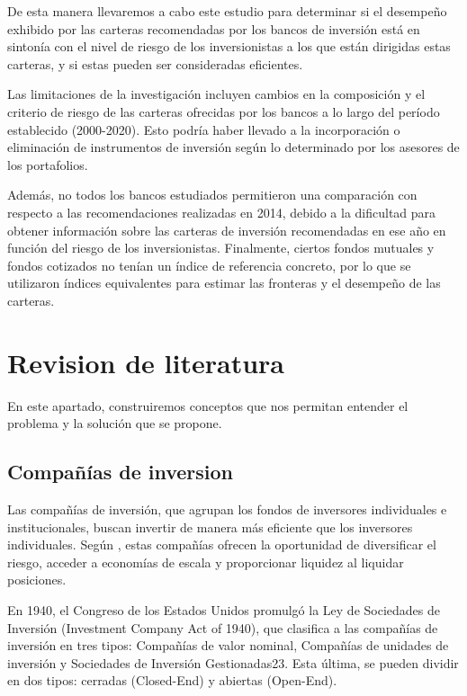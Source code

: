 \documentclass[a4paper,fleqn]{cas-sc}
\begin{document}
De esta manera llevaremos a cabo este estudio para determinar si el desempeño exhibido por las carteras recomendadas por los bancos de inversión está en sintonía con el nivel de riesgo de los inversionistas a los que están dirigidas estas carteras, y si estas pueden ser consideradas eficientes.

Las limitaciones de la investigación incluyen cambios en la composición y el criterio de riesgo de las carteras ofrecidas por los bancos a lo largo del período establecido {\color{red}(2000-2020)}. Esto podría haber llevado a la incorporación o eliminación de instrumentos de inversión según lo determinado por los asesores de los portafolios. 


Además, no todos los bancos estudiados permitieron una comparación con respecto a las recomendaciones realizadas en 2014, debido a la dificultad para obtener información sobre las carteras de inversión recomendadas en ese año en función del riesgo de los inversionistas. Finalmente, ciertos fondos mutuales y fondos cotizados no tenían un índice de referencia concreto, por lo que se utilizaron índices equivalentes para estimar las fronteras y el desempeño de las carteras.


\section{Revision de literatura}

En este apartado, construiremos conceptos que nos permitan entender el problema y la solución que se propone.

\subsection{Compañías de inversion}

Las compañías de inversión, que agrupan los fondos de inversores individuales e institucionales, buscan invertir de manera más eficiente que los inversores individuales. Según \cite{BECCALLI}, estas compañías ofrecen la oportunidad de diversificar el riesgo, acceder a economías de escala y proporcionar liquidez al liquidar posiciones.

En 1940, el Congreso de los Estados Unidos promulgó la Ley de Sociedades de Inversión (Investment Company Act of 1940), que clasifica a las compañías de inversión en tres tipos: Compañías de valor nominal, Compañías de unidades de inversión y Sociedades de Inversión Gestionadas23. Esta última, se pueden dividir en dos tipos: cerradas (Closed-End) y abiertas (Open-End). 
\end{document}
